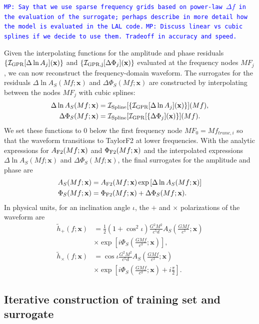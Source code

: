 \documentclass[prd,aps,letter,twocolumn,floatfix,notitlepage,nofootinbib]{revtex4-1}
\def\bx{\mathbf{x}}
\newcommand{\MP}[1]{{\textcolor{blue}{\texttt{MP: #1}} }}
\begin{document}
\MP{Say that we use sparse frequency grids based on power-law $\Delta f$ in the evaluation of the surrogate; perhaps describe in more detail how the model is evaluated in the LAL code.}
\MP{Discuss linear vs cubic splines if we decide to use them. Tradeoff in accuracy and speed.}

Given the interpolating functions for the amplitude and phase residuals $\{\mathcal{I}_{\rm GPR}[\Delta\ln A_j](\bx)\}$ and $\{\mathcal{I}_{\rm GPR, j}[\Delta\Phi_j](\bx)\}$ evaluated at the frequency nodes $MF_j$, we can now reconstruct the frequency-domain waveform. The surrogates for the residuals $\Delta\ln A_S(Mf;\bx)$ and $\Delta\Phi_S(Mf;\bx)$ are constructed by interpolating between the nodes $MF_j$ with cubic splines:
\begin{align}
\Delta\ln A_S(Mf;\bx) &= \mathcal{I}_{\rm Spline}[\{\mathcal{I}_{\rm GPR}[\Delta\ln A_j](\bx)\}](Mf),\\
\Delta\Phi_S(Mf;\bx) &= \mathcal{I}_{\rm Spline}[\mathcal{I}_{\rm GPR}[\{\Delta\Phi_j](\bx)\}](Mf).
\end{align}
We set these functions to 0 below the first frequency node $MF_0 =  Mf_{trunc,i}$ so that the waveform transitions to TaylorF2 at lower frequencies. With the analytic expressions for $A_{\rm F2}(Mf;\bx)$ and $\Phi_{\rm F2}(Mf;\bx)$ and the interpolated expressions $\Delta\ln A_S(Mf;\bx)$ and $\Delta\Phi_S(Mf;\bx)$, the final surrogates for the amplitude and phase are
\begin{align}
A_S(Mf;\bx) &= A_{\rm F2}(Mf;\bx) \exp\left[ \Delta\ln A_S(Mf;\bx) \right] \\
\Phi_S(Mf;\bx) &= \Phi_{\rm F2}(Mf;\bx) + \Delta\Phi_S(Mf;\bx).
\end{align}
In physical units, for an inclination angle $\iota$, the $+$ and $\times$ polarizations of the waveform are 
\begin{align}
\tilde h_+(f; \bx) &= \frac{1}{2}(1+\cos^2\iota) \frac{G^2 M^2}{c^5 d} A_S\left(\frac{GMf}{c^3}; \bx\right) \nonumber \\
& \times \exp\left[i \Phi_S\left(\frac{GMf}{c^3}; \bx\right)\right], \\
\tilde h_\times(f; \bx) &= \cos\iota \frac{G^2 M^2}{c^5 d} A_S\left(\frac{GMf}{c^3}; \bx\right) \nonumber \\
& \times \exp\left[i \Phi_S\left(\frac{GMf}{c^3}; \bx\right) + i \frac{\pi}{2}\right].
\end{align}


\subsection{Iterative construction of training set and surrogate}
\label{sec:design}
\end{document}
